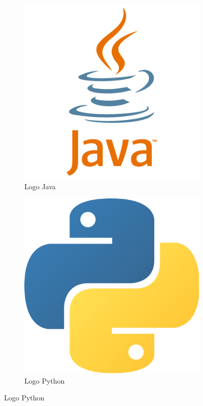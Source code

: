 \documentclass[12pt]{article}
\begin{document}
\begin{figure}[H]
\begin{subfigure}[b]{0.32\textwidth}
                \includegraphics[width=\textwidth]{img/6_java.png}
                \caption{Logo Java}
            \end{subfigure}
            \hfill
            \begin{subfigure}[b]{0.32\textwidth}
                \centering
                \includegraphics[width=\textwidth]{img/7_python.png}
                \caption{Logo Python}
            \end{subfigure}
        \end{figure}
       
\end{document}
